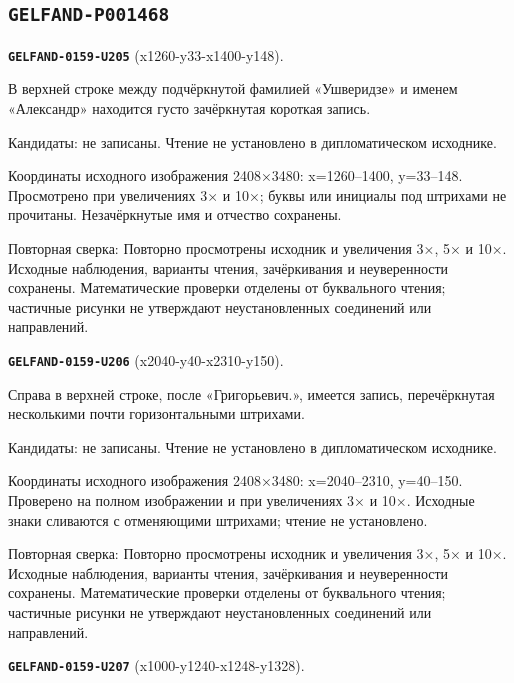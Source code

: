 \subsection*{\texttt{GELFAND-P001468}}
\par\noindent\leavevmode{}\label{GELFAND-0159-U205}\label{GELFAND-P001468:x1260-y33-x1400-y148}\textbf{\texttt{GELFAND-0159-U205}} (x1260-y33-x1400-y148).\nopagebreak[4]\par
В верхней строке между подчёркнутой фамилией «Ушверидзе» и именем «Александр» находится густо зачёркнутая короткая запись.\par
Кандидаты: не записаны. Чтение не установлено в дипломатическом исходнике.\par
Координаты исходного изображения 2408×3480: x=1260–1400, y=33–148. Просмотрено при увеличениях 3× и 10×; буквы или инициалы под штрихами не прочитаны. Незачёркнутые имя и отчество сохранены.\par
Повторная сверка: Повторно просмотрены исходник и увеличения 3×, 5× и 10×. Исходные наблюдения, варианты чтения, зачёркивания и неуверенности сохранены. Математические проверки отделены от буквального чтения; частичные рисунки не утверждают неустановленных соединений или направлений.\par\medskip
\par\noindent\leavevmode{}\label{GELFAND-0159-U206}\label{GELFAND-P001468:x2040-y40-x2310-y150}\textbf{\texttt{GELFAND-0159-U206}} (x2040-y40-x2310-y150).\nopagebreak[4]\par
Справа в верхней строке, после «Григорьевич.», имеется запись, перечёркнутая несколькими почти горизонтальными штрихами.\par
Кандидаты: не записаны. Чтение не установлено в дипломатическом исходнике.\par
Координаты исходного изображения 2408×3480: x=2040–2310, y=40–150. Проверено на полном изображении и при увеличениях 3× и 10×. Исходные знаки сливаются с отменяющими штрихами; чтение не установлено.\par
Повторная сверка: Повторно просмотрены исходник и увеличения 3×, 5× и 10×. Исходные наблюдения, варианты чтения, зачёркивания и неуверенности сохранены. Математические проверки отделены от буквального чтения; частичные рисунки не утверждают неустановленных соединений или направлений.\par\medskip
\par\noindent\leavevmode{}\label{GELFAND-0159-U207}\label{GELFAND-P001468:x1000-y1240-x1248-y1328}\textbf{\texttt{GELFAND-0159-U207}} (x1000-y1240-x1248-y1328).\nopagebreak[4]\par
